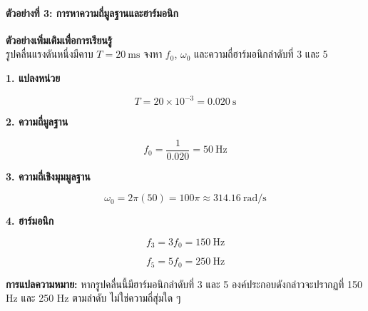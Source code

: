\paragraph{ตัวอย่างที่ 3: การหาความถี่มูลฐานและฮาร์มอนิก}

\textbf{ตัวอย่างเพิ่มเติมเพื่อการเรียนรู้}\\
รูปคลื่นแรงดันหนึ่งมีคาบ \(T=20\ \text{ms}\) จงหา \(f_0\), \(\omega_0\) และความถี่ฮาร์มอนิกลำดับที่ 3 และ 5

\textbf{1. แปลงหน่วย}

\[
T=20\times10^{-3}=0.020\ \text{s}
\]

\textbf{2. ความถี่มูลฐาน}

\[
f_0=\frac{1}{0.020}=50\ \text{Hz}
\]

\textbf{3. ความถี่เชิงมุมมูลฐาน}

\[
\omega_0=2\pi(50)=100\pi\approx314.16\ \text{rad/s}
\]

\textbf{4. ฮาร์มอนิก}

\[
f_3=3f_0=150\ \text{Hz}
\]

\[
f_5=5f_0=250\ \text{Hz}
\]

\textbf{การแปลความหมาย:} หากรูปคลื่นนี้มีฮาร์มอนิกลำดับที่ 3 และ 5 องค์ประกอบดังกล่าวจะปรากฏที่ 150 Hz และ 250 Hz ตามลำดับ ไม่ใช่ความถี่สุ่มใด ๆ


